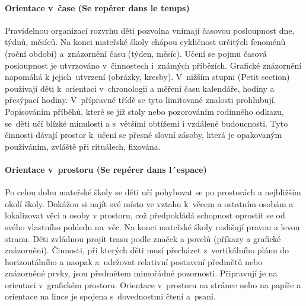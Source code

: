 			\paragraph{Orientace v čase (Se repérer dans le temps)}
				Pravidelnou organizací rozvrhu děti pozvolna vnímají časovou posloupnost dne, týdnů, měsíců. Na konci mateřské školy chápou cykličnost určitých fenoménů (roční období) a znázornění času (týden, měsíc). Učení se pojmu časová posloupnost je utvrzováno v činnostech i známých příbězích. Grafické znázornění napomáhá k jejich utvrzení (obrázky, kresby).
				V nižším stupni (Petit section) používají děti k orientaci v chronologii a měření času kalendáře, hodiny a přesýpací hodiny. V přípravné třídě se tyto limitované znalosti prohlubují. Popisováním příběhů, které se již staly nebo pozorováním rodinného odkazu, se děti učí blízké minulosti a s většími obtížemi i vzdálené budoucnosti.
				Tyto činnosti dávají prostor k učení se přesné slovní zásoby, která je opakovaným používáním, zvláště při rituálech, fixována.
			\paragraph{Orientace v prostoru (Se repérer dans l´espace)}
				Po celou dobu mateřské školy se děti učí pohybovat se po prostorách a nejbližším okolí školy. Dokážou si najít své místo ve vztahu k věcem a ostatním osobám a lokalizovat věci a osoby v prostoru, což předpokládá schopnost oprostit se od svého vlastního pohledu na věc. Na konci mateřské školy rozlišují pravou a levou stranu. Děti zvládnou projít trasu podle značek a povelů (příkazy a grafické znázornění).
				Činnosti, při kterých děti musí přecházet z vertikálního plánu do horizontálního a naopak a udržovat relativní postavení předmětů nebo znázorněné prvky, jsou předmětem mimořádné pozornosti. Připravují je na orientaci v grafickém prostoru. Orientace v prostoru na stránce nebo na papíře a orientace na lince je spojena s dovednostmi čtení a psaní. 
